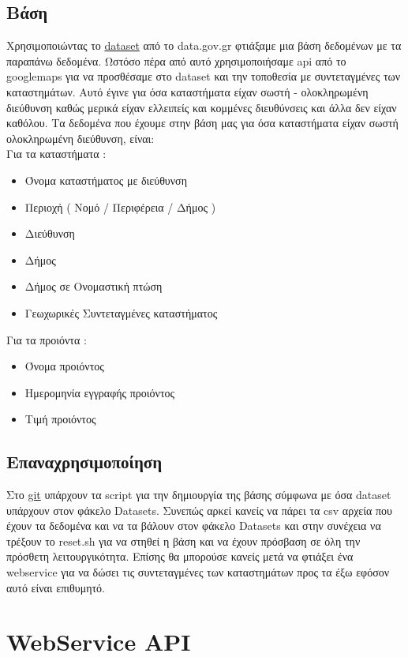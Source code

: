 \documentclass[a4paper,10pt]{report}
\begin{document}
\subsection{Βάση}
Χρησιμοποιώντας το \href{http://www.data.gov.gr/dataset/17/}{dataset} από το data.gov.gr 
φτιάξαμε μια βάση δεδομένων με τα παραπάνω δεδομένα. Ωστόσο πέρα από αυτό χρησιμοποιήσαμε
api από το googlemaps για να προσθέσαμε στο dataset και την τοποθεσία με συντεταγμένες των 
καταστημάτων. Αυτό έγινε για όσα καταστήματα είχαν σωστή - ολοκληρωμένη διεύθυνση καθώς
μερικά είχαν ελλειπείς και κομμένες διευθύνσεις και άλλα δεν είχαν καθόλου. 
Τα δεδομένα που έχουμε στην βάση μας για όσα καταστήματα είχαν σωστή 
ολοκληρωμένη διεύθυνση, είναι: \\
Για τα καταστήματα :
\begin{itemize}
 \item Όνομα καταστήματος με διεύθυνση
 \item Περιοχή ( Νομό / Περιφέρεια / Δήμος )
 \item Διεύθυνση 
 \item Δήμος 
 \item Δήμος σε Ονομαστική πτώση
 \item Γεωχωρικές Συντεταγμένες καταστήματος
\end{itemize}
\newpage
Για τα προιόντα :
\begin{itemize}
 \item Όνομα προιόντος
 \item Ημερομηνία εγγραφής προιόντος 
 \item Τιμή προιόντος
\end{itemize}


\subsection{Επαναχρησιμοποίηση}
Στο \href{https://github.com/Pana-sonic/aginara/tree/master/Database}{git} υπάρχουν τα script 
για την δημιουργία της βάσης σύμφωνα με όσα dataset υπάρχουν στον φάκελο Datasets. Συνεπώς αρκεί
κανείς να πάρει τα csv αρχεία που έχουν τα δεδομένα και να τα βάλουν στον φάκελο Datasets και στην
συνέχεια να τρέξουν το reset.sh για να στηθεί η βάση και να έχουν πρόσβαση σε όλη την πρόσθετη
λειτουργικότητα. Επίσης θα μπορούσε κανείς μετά να φτιάξει ένα webservice για να δώσει τις 
συντεταγμένες των καταστημάτων προς τα έξω εφόσον αυτό είναι επιθυμητό.

\section{WebService API}
\end{document}
